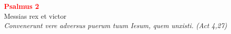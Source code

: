 
\def\greinitialformat#1{%
{\fontsize{43}{43}\selectfont #1}%
}




\vspace{0.3cm}
\begin{center}
 \textcolor{red}{\large \bf Psalmus 2}\\
Messias rex et victor\\
\textit{\small Convenerunt vere adversus puerum tuum Iesum, quem unxisti.
(Act 4,27)}
\end{center}
